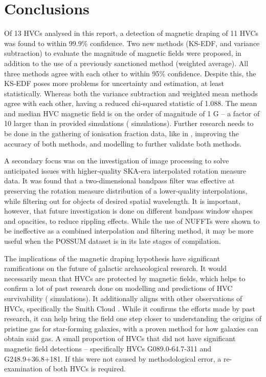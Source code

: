 \chapter{Conclusions}
\label{cha:conclusion}

Of 13 HVCs analysed in this report, a detection of magnetic draping of 11 HVCs was found to within 99.9\% confidence. Two new methods (KS-EDF, and variance subtraction) to evaluate the magnitude of magnetic fields were proposed, in addition to the use of a previously sanctioned method (weighted average). All three methods agree with each other to within 95\% confidence. Despite this, the KS-EDF poses more problems for uncertainty and estimation, at least statistically. Whereas both the variance subtraction and weighted mean methods agree with each other, having a reduced chi-squared statistic of 1.088. The mean and median HVC magnetic field is on the order of magnitude of 1 \textmu G – a factor of 10 larger than in provided simulations (\citeauthor{ID23} simulations). Further research needs to be done in the gathering of ionisation fraction data, like in \cite{ID67}, improving the accuracy of both methods, and modelling to further validate both methods.

A secondary focus was on the investigation of image processing to solve anticipated issues with higher-quality SKA-era interpolated rotation measure data. It was found that a two-dimensional bandpass filter was effective at preserving the rotation measure distribution of a lower-quality interpolations, while filtering out for objects of desired spatial wavelength. It is important, however, that future investigation is done on different bandpass window shapes and opacities, to reduce rippling effects. While the use of NUFFTs were shown to be ineffective as a combined interpolation and filtering method, it may be more useful when the POSSUM dataset is in its late stages of compilation.

The implications of the magnetic draping hypothesis have significant ramifications on the future of galactic archaeological research. It would necessarily mean that HVCs are protected by magnetic fields, which helps to confirm a lot of past research done on modelling and predictions of HVC survivability (\citeauthor{ID23} simulations). It additionally aligns with other observations of HVCs, specifically the Smith Cloud \citep{ID5, ID26}. While it confirms the efforts made by past research, it can help bring the field one step closer to understanding the origins of pristine gas for star-forming galaxies, with a proven method for how galaxies can obtain said gas. A small proportion of HVCs that did not have significant magnetic field detections – specifically HVCs G089.0-64.7-311 and G248.9+36.8+181. If this were not caused by methodological error, a re-examination of both HVCs is required.

